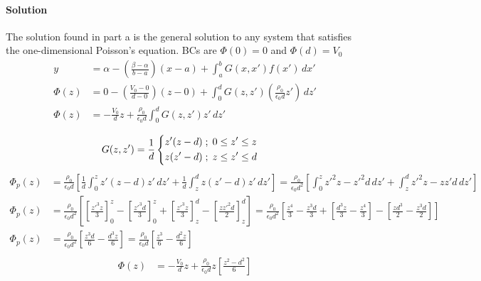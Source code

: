 \documentclass{article}
\begin{document}
{\begin{enumerate}
		\paragraph{Solution} The solution found in part a is the general solution to any system that satisfies the one-dimensional Poisson's equation. BCs are $\Phi(0) = 0$ and $\Phi(d) = V_0$
		\begin{equation}
			\begin{split}
				y &= \alpha - \left( \frac{\beta - \alpha}{b - a} \right) (x - a) + \int_{a}^{b} G(x,x') f(x') \, dx' \\
				\Phi(z) &= 0 - \left( \frac{V_0 - 0}{d - 0} \right) (z - 0) + \int_{0}^{d} G(z,z') \left( \frac{\rho_0}{\epsilon_0 d}z' \right) \, dz' \\
				\Phi(z) &= -\frac{V_0 }{d}z + \frac{\rho_0}{\epsilon_0 d} \int_{0}^{d} G(z,z') z' \, dz' \\
			\end{split}
		\end{equation}
		\begin{equation*}
			\begin{split}
				G(z,z') = \frac{1}{d}
				&\begin{dcases}
					z'(z - d) \; ; \; 0 \leq z' \leq z \\
					z(z' - d) \; ; \; z \leq z' \leq d
				\end{dcases}
			\end{split}
		\end{equation*}
		\begin{equation*}
			\begin{split}
				\Phi_p(z) &= \frac{\rho_0}{\epsilon_0 d} \left[ \frac{1}{d} \int_{0}^{z} z'(z-d)z' \, dz' + \frac{1}{d} \int_{z}^{d} z(z'-d)z' \, dz' \right] = \frac{\rho_0}{\epsilon_0 d^2} \left[ \int_{0}^{z} z'^2z - z'^2d \, dz' + \int_{z}^{d} z'^2z- zz'd \, dz' \right] \\
				\Phi_p(z) &= \frac{\rho_0}{\epsilon_0 d^2} \left[ \left[ \frac{z'^3 z}{3} \right]^z_0 - \left[ \frac{z'^3 d}{3} \right]^z_0 + \left[ \frac{z'^3 z}{3} \right]^d_z - \left[ \frac{zz'^2d}{2} \right]^d_z \right] = \frac{\rho_0}{\epsilon_0 d^2} \left[ \frac{z^4}{3} - \frac{z^3 d}{3} + \left[ \frac{d^3 z}{3} - \frac{z^4}{3} \right] - \left[ \frac{z d^3}{2} - \frac{z^3 d}{2} \right] \right] \\
				\Phi_p(z) &= \frac{\rho_0}{\epsilon_0 d^2} \left[ \frac{z^3 d}{6} - \frac{d^3 z}{6} \right] = \frac{\rho_0}{\epsilon_0 d} \left[ \frac{z^3}{6} - \frac{d^2 z}{6} \right]  \\
			\end{split}
		\end{equation*}
		\begin{equation*}
			\begin{split}
				\Phi(z) &= -\frac{V_0 }{d}z + \frac{\rho_0}{\epsilon_0 d}z \left[ \frac{z^2 - d^2}{6} \right]  \\
			\end{split}
		\end{equation*}
	\end{enumerate}
	
}
\end{document}
